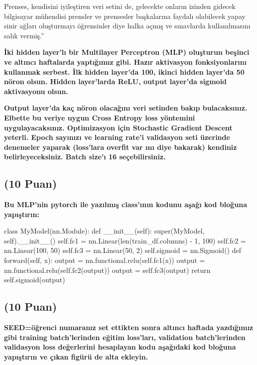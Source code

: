 \documentclass[11pt]{article}
\begin{document}
Prenses, kendisini iyileştiren veri setini de, gelecekte onların izinden gidecek bilgisayar mühendisi prensler ve prensesler başkalarına faydalı olabilecek yapay sinir ağları oluşturmayı öğrensinler diye halka açmış ve sınavlarda kullanılmasını salık vermiş.''

\textbf{İki hidden layer'lı bir Multilayer Perceptron (MLP) oluşturun beşinci ve altıncı haftalarda yaptığımız gibi. Hazır aktivasyon fonksiyonlarını kullanmak serbest. İlk hidden layer'da 100, ikinci hidden layer'da 50 nöron olsun. Hidden layer'larda ReLU, output layer'da sigmoid aktivasyonu olsun.}

\textbf{Output layer'da kaç nöron olacağını veri setinden bakıp bulacaksınız. Elbette bu veriye uygun Cross Entropy loss yöntemini uygulayacaksınız. Optimizasyon için Stochastic Gradient Descent yeterli. Epoch sayınızı ve learning rate'i validasyon seti üzerinde denemeler yaparak (loss'lara overfit var mı diye bakarak) kendiniz belirleyeceksiniz. Batch size'ı 16 seçebilirsiniz.}

\subsection{(10 Puan)} \textbf{Bu MLP'nin pytorch ile yazılmış class'ının kodunu aşağı kod bloğuna yapıştırın:}

\begin{python}
class MyModel(nn.Module):
    def __init__(self):
        super(MyModel, self).__init__()
        self.fc1 = nn.Linear(len(train_df.columns) - 1, 100) 
        self.fc2 = nn.Linear(100, 50) 
        self.fc3 = nn.Linear(50, 2)
        self.sigmoid = nn.Sigmoid()
    def forward(self, x):
        output = nn.functional.relu(self.fc1(x))
        output = nn.functional.relu(self.fc2(output))
        output = self.fc3(output)
        return self.sigmoid(output)
\end{python}

\subsection{(10 Puan)} \textbf{SEED=öğrenci numaranız set ettikten sonra altıncı haftada yazdığımız gibi training batch'lerinden eğitim loss'ları, validation batch'lerinden validasyon loss değerlerini hesaplayan kodu aşağıdaki kod bloğuna yapıştırın ve çıkan figürü de alta ekleyin.}
\end{document}
